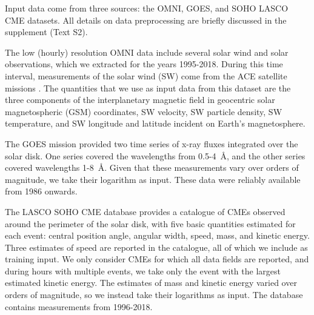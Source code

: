 \documentclass[draft,linenumbers]{agujournal2018}
\begin{document}
Input data come from three sources: the OMNI, GOES, and SOHO LASCO CME datasets. All details on data preprocessing are briefly discussed in the supplement (Text S2).

The low (hourly) resolution OMNI data include several solar wind and solar observations, which we extracted for the years 1995-2018. During this time interval, measurements of the solar wind (SW) come from the ACE  satellite missions . The quantities that we use as input data from this dataset are the three components of the interplanetary magnetic field in geocentric solar magnetospheric (GSM) coordinates, SW velocity, SW particle density, SW temperature, and SW longitude and latitude incident on Earth's magnetosphere. 

The GOES mission provided two time series of x-ray fluxes integrated over the solar disk. One series covered the wavelengths from 0.5-4~\r{A}, and the other series covered wavelengths 1-8~\r{A}. Given that these measurements vary over orders of magnitude, we take their logarithm as input. These data were reliably available from 1986 onwards.

The LASCO SOHO CME database provides a catalogue of CMEs observed around the perimeter of the solar disk, with five basic quantities estimated for each event: central position angle, angular width, speed, mass, and kinetic energy. Three estimates of speed are reported in the catalogue, all of which we include as training input. We only consider CMEs for which all data fields are reported, and during hours with multiple events, we take only the event with the largest estimated kinetic energy. The estimates of mass and kinetic energy varied over orders of magnitude, so we instead take their logarithms as input. The database contains measurements from 1996-2018.

\end{document}
